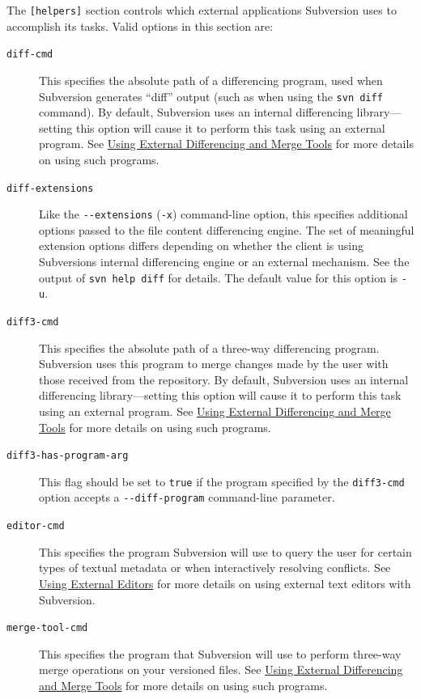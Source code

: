 The \texttt{{[}helpers{]}} section controls which external applications
Subversion uses to accomplish its tasks. Valid options in this section
are:

\begin{description}
\item[\texttt{diff-cmd}]
This specifies the absolute path of a differencing program, used when
Subversion generates ``diff'' output (such as when using the
\texttt{svn\ diff} command). By default, Subversion uses an internal
differencing library---setting this option will cause it to perform this
task using an external program. See
\hyperref[svn.advanced.externaldifftools]{Using External Differencing
and Merge Tools} for more details on using such programs.
\item[\texttt{diff-extensions}]
Like the \texttt{-\/-extensions} (\texttt{-x}) command-line option, this
specifies additional options passed to the file content differencing
engine. The set of meaningful extension options differs depending on
whether the client is using Subversion\textquotesingle s internal
differencing engine or an external mechanism. See the output of
\texttt{svn\ help\ diff} for details. The default value for this option
is \texttt{-u}.
\item[\texttt{diff3-cmd}]
This specifies the absolute path of a three-way differencing program.
Subversion uses this program to merge changes made by the user with
those received from the repository. By default, Subversion uses an
internal differencing library---setting this option will cause it to
perform this task using an external program. See
\hyperref[svn.advanced.externaldifftools]{Using External Differencing
and Merge Tools} for more details on using such programs.
\item[\texttt{diff3-has-program-arg}]
This flag should be set to \texttt{true} if the program specified by the
\texttt{diff3-cmd} option accepts a \texttt{-\/-diff-program}
command-line parameter.
\item[\texttt{editor-cmd}]
This specifies the program Subversion will use to query the user for
certain types of textual metadata or when interactively resolving
conflicts. See \hyperref[svn.advanced.externaleditors]{Using External
Editors} for more details on using external text editors with
Subversion.
\item[\texttt{merge-tool-cmd}]
This specifies the program that Subversion will use to perform three-way
merge operations on your versioned files. See
\hyperref[svn.advanced.externaldifftools]{Using External Differencing
and Merge Tools} for more details on using such programs.
\end{description}

